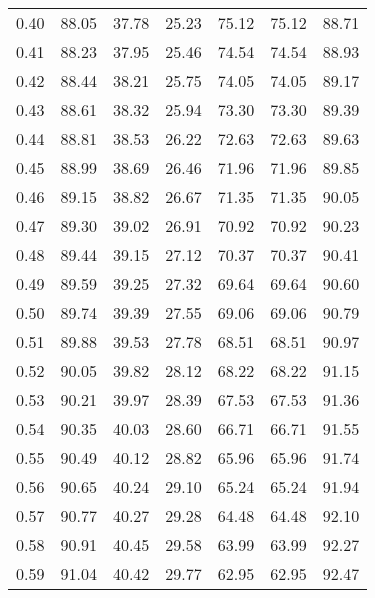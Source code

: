 \begin{tabular}{|c|c|c|c|c|c|c|}
      0.40 &     88.05 &     37.78 &      25.23 &   75.12 &      75.12 &         88.71 \\
      0.41 &     88.23 &     37.95 &      25.46 &   74.54 &      74.54 &         88.93 \\
      0.42 &     88.44 &     38.21 &      25.75 &   74.05 &      74.05 &         89.17 \\
      0.43 &     88.61 &     38.32 &      25.94 &   73.30 &      73.30 &         89.39 \\
      0.44 &     88.81 &     38.53 &      26.22 &   72.63 &      72.63 &         89.63 \\
      0.45 &     88.99 &     38.69 &      26.46 &   71.96 &      71.96 &         89.85 \\
      0.46 &     89.15 &     38.82 &      26.67 &   71.35 &      71.35 &         90.05 \\
      0.47 &     89.30 &     39.02 &      26.91 &   70.92 &      70.92 &         90.23 \\
      0.48 &     89.44 &     39.15 &      27.12 &   70.37 &      70.37 &         90.41 \\
      0.49 &     89.59 &     39.25 &      27.32 &   69.64 &      69.64 &         90.60 \\
      0.50 &     89.74 &     39.39 &      27.55 &   69.06 &      69.06 &         90.79 \\
      0.51 &     89.88 &     39.53 &      27.78 &   68.51 &      68.51 &         90.97 \\
      0.52 &     90.05 &     39.82 &      28.12 &   68.22 &      68.22 &         91.15 \\
      0.53 &     90.21 &     39.97 &      28.39 &   67.53 &      67.53 &         91.36 \\
      0.54 &     90.35 &     40.03 &      28.60 &   66.71 &      66.71 &         91.55 \\
      0.55 &     90.49 &     40.12 &      28.82 &   65.96 &      65.96 &         91.74 \\
      0.56 &     90.65 &     40.24 &      29.10 &   65.24 &      65.24 &         91.94 \\
      0.57 &     90.77 &     40.27 &      29.28 &   64.48 &      64.48 &         92.10 \\
      0.58 &     90.91 &     40.45 &      29.58 &   63.99 &      63.99 &         92.27 \\
      0.59 &     91.04 &     40.42 &      29.77 &   62.95 &      62.95 &         92.47 \\

\end{tabular}
